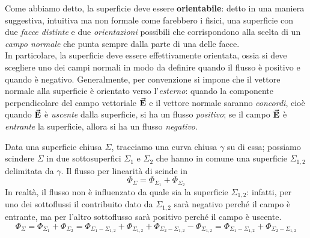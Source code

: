 Come abbiamo detto, la superficie deve essere \textbf{orientabile}: detto in una maniera suggestiva, intuitiva ma non formale come farebbero i fisici, una superficie con due \textit{facce distinte} e due \textit{orientazioni} possibili che corrispondono alla scelta di un \textit{campo normale} che punta sempre dalla parte di una delle facce.\\
In particolare, la superficie deve essere effettivamente orientata, ossia si deve scegliere uno dei campi normali in modo da definire quando il flusso è positivo e quando è negativo. Generalmente, per convenzione si impone che il vettore normale alla superficie è orientato verso l'\textit{esterno}: quando la componente perpendicolare del campo vettoriale $\vb*{\va{E}}$ e il vettore normale saranno \textit{concordi}, cioè quando $\vb*{\va{E}}$ è \textit{uscente} dalla superficie, si ha un flusso \textit{positivo}; se il campo $\vb*{\va{E}}$ è \textit{entrante} la superficie, allora si ha un flusso \textit{negativo}.
\begin{observe} %
	Data una superficie chiusa $\Sigma$, tracciamo una curva chiusa $\gamma$ su di essa; possiamo scindere $\Sigma$ in due sottosuperfici $\Sigma_1$ e $\Sigma_2$ che hanno in comune una superficie $\Sigma_{1,2}$ delimitata da $\gamma$.
	Il flusso per linearità di scinde in
	\begin{equation*}
		\Phi_{\Sigma}=\Phi_{\Sigma_1}+\Phi_{\Sigma_2}
	\end{equation*}
	In realtà, il flusso non è influenzato da quale sia la superficie  $\Sigma_{1,2}$: infatti, per uno dei sottoflussi il contribuito dato da $ \Sigma_{1,2}$ sarà negativo perché il campo è entrante, ma per l'altro sottoflusso sarà positivo perché il campo è uscente.
	\begin{equation*}
		\Phi_{\Sigma}=\Phi_{\Sigma_1}+\Phi_{\Sigma_2}=\Phi_{\Sigma_1-\Sigma_{1,2}}+\Phi_{\Sigma_{1,2}}+\Phi_{\Sigma_2-\Sigma_{1,2}}-\Phi_{\Sigma_{1,2}}=\Phi_{\Sigma_1-\Sigma_{1,2}}+\Phi_{\Sigma_2-\Sigma_{1,2}}
	\end{equation*}
\end{observe}
